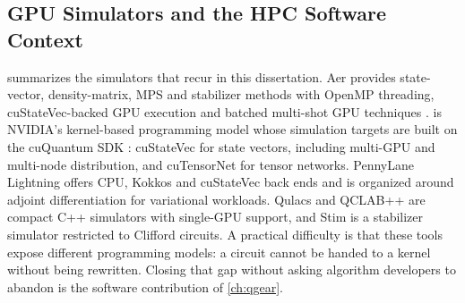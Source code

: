 \subsection{GPU Simulators and the HPC Software Context}

 summarizes the simulators that recur in this dissertation. \qiskit{} Aer \cite{javadiabhari2024qiskit} provides state-vector, density-matrix, MPS and stabilizer methods with OpenMP threading, cuStateVec-backed GPU execution and batched multi-shot GPU techniques \cite{doi2023multishotgpu}. \cudaq{} \cite{kim2023cudaquantum} is NVIDIA's kernel-based programming model whose simulation targets are built on the cuQuantum SDK \cite{bayraktar2023cuquantum}: cuStateVec for state vectors, including multi-GPU and multi-node distribution, and cuTensorNet for tensor networks. PennyLane Lightning \cite{asadi2024pennylanelightning} offers CPU, Kokkos and cuStateVec back ends and is organized around adjoint differentiation for variational workloads. Qulacs \cite{suzuki2021qulacs} and QCLAB++ \cite{vanbeeumen2023qclabpp} are compact C++ simulators with single-GPU support, and Stim \cite{gidney2021stim} is a stabilizer simulator restricted to Clifford circuits. A practical difficulty is that these tools expose different programming models: a \qiskit{} circuit cannot be handed to a \cudaq{} kernel without being rewritten. Closing that gap without asking algorithm developers to abandon \qiskit{} is the software contribution of \cref{ch:qgear}.

